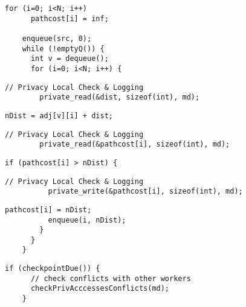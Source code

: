   \begin{lstlisting}[morekeywords={pathcost},aboveskip=0pt, belowskip=0pt, firstnumber=auto,name=dij_checks]
    for (i=0; i<N; i++)
      pathcost[i] = inf;

    enqueue(src, 0);
    while (!emptyQ()) {
      int v = dequeue();
      for (i=0; i<N; i++) {
  \end{lstlisting}

  \begin{lstlisting}[morekeywords={pathcost,dist}, aboveskip=0pt,belowskip=0pt,backgroundcolor=\color{lightgray},
  firstnumber=auto, name=dij_checks]
        // Privacy Local Check & Logging
        private_read(&dist, sizeof(int), md);
  \end{lstlisting}

  \begin{lstlisting}[morekeywords={pathcost,dist}, aboveskip=0pt, belowskip=0pt, firstnumber=auto,name=dij_checks]
        nDist = adj[v][i] + dist;
  \end{lstlisting}

  \begin{lstlisting}[morekeywords={pathcost}, aboveskip=0pt,belowskip=0pt,backgroundcolor=\color{lightgray},
  firstnumber=auto, name=dij_checks]
        // Privacy Local Check & Logging
        private_read(&pathcost[i], sizeof(int), md);
  \end{lstlisting}


  \begin{lstlisting}[morekeywords={pathcost}, aboveskip=0pt, belowskip=0pt, firstnumber=auto,name=dij_checks]
        if (pathcost[i] > nDist) {
  \end{lstlisting}

  \begin{lstlisting}[morekeywords={pathcost}, aboveskip=0pt,belowskip=0pt,backgroundcolor=\color{lightgray},
  firstnumber=auto, name=dij_checks]
          // Privacy Local Check & Logging
          private_write(&pathcost[i], sizeof(int), md);
  \end{lstlisting}

  \begin{lstlisting}[morekeywords={pathcost}, aboveskip=0pt, belowskip=0pt, firstnumber=auto,name=dij_checks]
          pathcost[i] = nDist;
          enqueue(i, nDist);
        }
      }
    }
    \end{lstlisting}

  \begin{lstlisting}[morekeywords={pathcost}, aboveskip=0pt,belowskip=0pt,backgroundcolor=\color{lightgray},
  firstnumber=auto, name=dij_checks]
    if (checkpointDue()) {
      // check conflicts with other workers
      checkPrivAcccessesConflicts(md);
    }
  \end{lstlisting}


